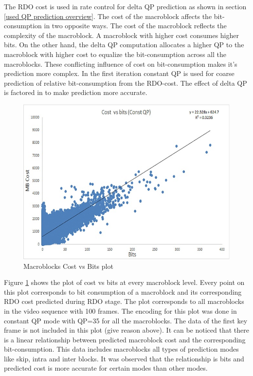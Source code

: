 \documentclass[11pt]{article} %
\begin{document}
The RDO cost is used in rate control for delta QP prediction as shown in section \ref{used QP prediction overview}. The cost of the macroblock affects the bit-consumption in two opposite ways. The cost of the macroblock reflects the complexity of the macroblock. A macroblock with higher cost consumes higher bits. On the other hand, the delta QP computation allocates a higher QP to the macroblock with higher cost to equalize the bit-consumption across all the macroblocks. These conflicting influence of cost on bit-consumption makes it's prediction more complex. In the first iteration constant QP is used for coarse prediction of relative bit-consumption from the RDO-cost. The effect of delta QP is factored in to make prediction more accurate.

\begin{figure}[!h]
	\centering
	\includegraphics[scale=0.75]{CostVsBits/CostvsBits_ConstQP_Full}  
	\caption{Macroblocks Cost vs Bits plot}
	\label{fig:CostvsBits_ConstQP_Full}
\end{figure}

Figure \ref{fig:CostvsBits_ConstQP_Full} shows the plot of cost vs bits at every macroblock level. Every point on this plot corresponds to bit consumption of a macroblock and its corresponding RDO cost predicted during RDO stage. The plot corresponds to all macroblocks in the video sequence with 100 frames. The encoding for this plot was done in constant QP mode with QP=35 for all the macroblocks. The data of the first key frame is not included in this plot (give reason above). It can be noticed that there is a linear relationship between predicted macroblock cost and the corresponding bit-consumption. This data includes macroblocks all types of prediction modes like skip, intra and inter blocks. It was observed that the relationship is bits and predicted cost is more accurate for certain modes than other modes.
\end{document}
